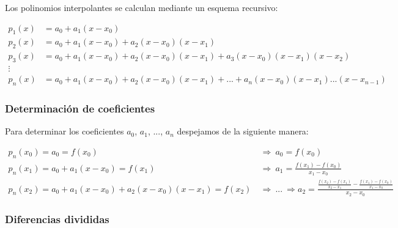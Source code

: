 \documentclass{article}
\begin{document}
Los polinomios interpolantes se calculan mediante un esquema recursivo:

\begin{align*}
    p_1(x) &= a_0 + a_1(x-x_0) \\
    p_2(x) &= a_0 + a_1(x-x_0) + a_2(x-x_0)(x-x_1) \\
    p_3(x) &= a_0 + a_1(x-x_0) + a_2(x-x_0)(x-x_1) + a_3(x-x_0)(x-x_1)(x-x_2) \\
    \vdots \\
    p_n(x) &= a_0 + a_1(x-x_0) + a_2(x-x_0)(x-x_1) + ... + a_n(x-x_0)(x-x_1)...(x-x_{n-1})
\end{align*}

\subsubsection{Determinación de coeficientes}

Para determinar los coeficientes $a_0$, $a_1$, ..., $a_n$ despejamos de la 
siguiente manera:

\begin{align*}
    p_n(x_0) = a_0 = f(x_0)\ &\Rightarrow\ a_0 = f(x_0) \\
    p_n(x_1) = a_0 + a_1(x-x_0) = f(x_1)\ &\Rightarrow\ a_1 = \frac{f(x_1) - f(x_0)}{x_1 - x_0} \\
    p_n(x_2) = a_0 + a_1(x-x_0) + a_2(x-x_0)(x-x_1) = f(x_2)\ &\Rightarrow\ ...\ \Rightarrow a_2 = \frac{\frac{f(x_2) - f(x_1)}{x_2-x_1} - \frac{f(x_1) - f(x_0)}{x_1 - x_0}}{x_2 - x_0}
\end{align*}

\subsubsection{Diferencias divididas}
\end{document}
